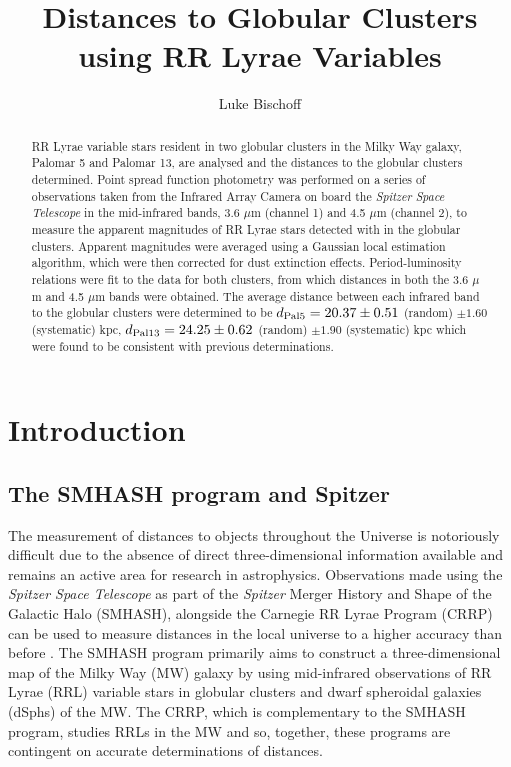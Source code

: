 \documentclass[11pt]{iopart}
\begin{document}
\title[Distances to Globular Clusters using RR Lyrae Variables]{Distances to Globular Clusters using RR Lyrae Variables}

\author{Luke Bischoff}

\address{Department of Physics, University of Bath, Bath BA2 7AY, United Kingdom}
\begin{abstract}
RR Lyrae variable stars resident in two globular clusters in the Milky Way galaxy, Palomar 5 and Palomar 13, are analysed and the distances to the globular clusters determined. Point spread function photometry was performed on a series of observations taken from the Infrared Array Camera on board the \textit{Spitzer Space Telescope} in the mid-infrared bands, 3.6 $\mu$m (channel 1) and 4.5 $\mu$m (channel 2), to measure the apparent magnitudes of RR Lyrae stars detected with in the globular clusters. Apparent magnitudes were averaged using a Gaussian local estimation algorithm, which were then corrected for dust extinction effects. Period-luminosity relations were fit to the data for both clusters, from which distances in both the 3.6 $\mu$m and 4.5 $\mu$m bands were obtained. The average distance between each infrared band to the globular clusters were determined to be $d_{\rm Pal 5} = 20.37 \pm 0.51$ (random) $\pm 1.60$ (systematic) kpc, $d_{\rm Pal 13} = 24.25 \pm 0.62$ (random) $\pm 1.90$ (systematic) kpc which were found to be consistent with previous determinations.
\end{abstract}

\section{Introduction}

\subsection{The SMHASH program and Spitzer}
\label{smhash}
The measurement of distances to objects throughout the Universe is notoriously difficult due to the absence of direct three-dimensional information available and remains an active area for research in astrophysics. Observations made using the \textit{Spitzer Space Telescope} as part of the  \textit{Spitzer} Merger History and Shape of the Galactic Halo (SMHASH), alongside the Carnegie RR Lyrae Program (CRRP) can be used to measure distances in the local universe to a higher accuracy than before \cite{monson2017}. The SMHASH program primarily aims to construct a three-dimensional map of the Milky Way (MW) galaxy \cite{garofalo2018smhash} by using mid-infrared observations of RR Lyrae (RRL) variable stars in globular clusters and dwarf spheroidal galaxies (dSphs) of the MW. The CRRP, which is complementary to the SMHASH program, studies RRLs in the MW \cite{muraveva2018crrp} and so, together, these programs are contingent on accurate determinations of distances.
\end{document}

